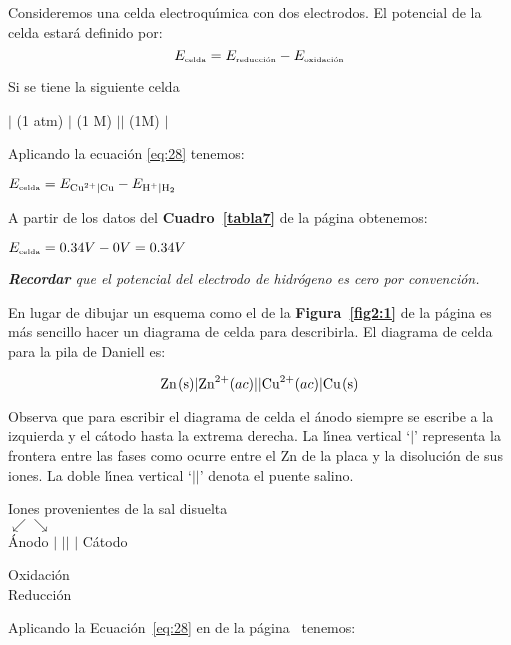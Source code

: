 Consideremos una celda electroqu\'{\i}mica con dos
electrodos.  El potencial de
la celda  estar\'a definido por:
\begin{equation}
E_{\textrm{\tiny celda}} = E_{\textrm{\tiny reducci\'on}}-E_{\textrm{\tiny oxidaci\'on}}
\label{eq:28}
\end{equation}
\begin{example}
Si se tiene la siguiente celda

\begin{center}
$|$ (1 atm) $|$  (1 M) $||$  (1M) $|$ 
\end{center}
Aplicando la ecuaci\'on \ref{eq:28} tenemos:
\begin{center}
$E_{\textrm{\tiny celda}} = E_{\ce{Cu^2+}|\ce{Cu}}-E_{\ce{H+}|\ce{H2}}$
\end{center}
A partir de los datos del \textbf{Cuadro~\ref{tabla7}} de la p\'agina \pageref{tabla7} obtenemos:
\begin{center}
$E_{\textrm{\tiny celda}} = 0.34  V - 0 V =  0.34 V$
\end{center}
\textit{\textbf{Recordar} que el potencial del electrodo de hidr\'ogeno es cero
por convenci\'on.}
\end{example}


En lugar de  dibujar un esquema como el de la \textbf{Figura~\ref{fig2:1}} de la
p\'agina \pageref{fig2:1} es m\'as sencillo hacer un diagrama de celda para describirla. El
diagrama de
 celda para la pila de Daniell  es:

$$\ce{Zn(s)}|\ce{Zn^2+}(ac)||\ce{Cu^2+}(ac)|\ce{Cu(s)}$$

Observa que para escribir el diagrama de celda el \'anodo siempre se escribe a la izquierda
y el c\'atodo hasta la extrema derecha. La l\'{\i}nea vertical `$|$' representa la frontera
entre las fases como ocurre entre el Zn de la placa y la disoluci\'on de sus iones. La doble
l\'{\i}nea vertical `$||$' denota el puente salino.
\begin{center}
Iones provenientes de la sal disuelta\\
$\swarrow \searrow$\\
\'Anodo $|$ $||$  $|$   C\'atodo
\end{center}
\begin{description}
\item[Oxidaci\'on] 
\item[Reducci\'on] 
\end{description}
Aplicando la Ecuaci\'on~\ref{eq:28} en de la p\'agina~\pageref{eq:28} tenemos:

